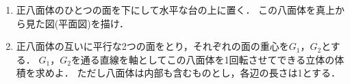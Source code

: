 \documentclass[../../main.tex]{subfiles}
\begin{document}
\begin{enumerate}
  \item 正八面体のひとつの面を下にして水平な台の上に置く．
    この八面体を真上から見た図(平面図)を描け．
  \item 正八面体の互いに平行な2つの面をとり，それぞれの面の重心を$G_1$，$G_2$とする．
    $G_1$，$G_2$を通る直線を軸としてこの八面体を1回転させてできる立体の体積を求めよ．
    ただし八面体は内部も含むものとし，各辺の長さは1とする．
\end{enumerate}
\end{document}
